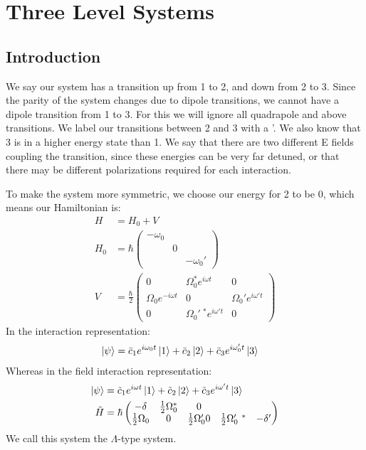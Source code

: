 \section{Three Level Systems}
\subsection{Introduction}
We say our system has a transition up from 1 to 2, and down from 2 to 3. Since the parity of the system changes due to dipole transitions, we cannot have a dipole transition from 1 to 3. 
For this we will ignore all quadrapole and above transitions. We label our transitions between 2 and 3 with a '. We also know that 3 is in a higher energy state than 1.
We say that there are two different E fields coupling the transition, since these energies can be very far detuned, or that there may be different polarizations required for each interaction.

To make the system more symmetric, we choose our energy for 2 to be 0, which means our Hamiltonian is:
\begin{align*}
	H &= H_0 + V \\
	H_0 &= \hbar \begin{pmatrix}
		-\omega_0 & & \\
			  & 0& \\
			  && -\omega_0'
		     \end{pmatrix}\\
	V &= \frac{\hbar}{2} \begin{pmatrix}
		0 & \Omega_0^* e^{i\omega t} & 0 \\
		\Omega_0 e^{-i\omega t} & 0 & \Omega_0' e^{i\omega' t} \\
		0 & \Omega_0'\ ^* e^{i\omega' t} & 0
			     \end{pmatrix}
\end{align*}
In the interaction representation:
\begin{align*}
	\ket{\psi} &= \bar{c}_1 e^{i\omega_0 t} \ket{1} + \bar{c}_2\ket{2} + \bar{c}_3 e^{i\omega_0' t}\ket{3}
\end{align*}
Whereas in the field interaction representation:
\begin{align*}
	\ket{\psi} &= \tilde{c}_1 e^{i\omega t} \ket{1} + \tilde{c}_2\ket{2} + \tilde{c}_3 e^{i\omega' t}\ket{3} \\
	\tilde{H} &= \hbar \begin{pmatrix}
		-\delta & \frac{1}{2}\Omega_0^* & 0 \\
		\frac{1}{2}\Omega_0 & 0 & \frac{1}{2}\Omega_0'
		0	&\frac{1}{2}\Omega_0'\ ^*   & -\delta'
			   \end{pmatrix}
\end{align*}
We call this system the $\Lambda$-type system.
